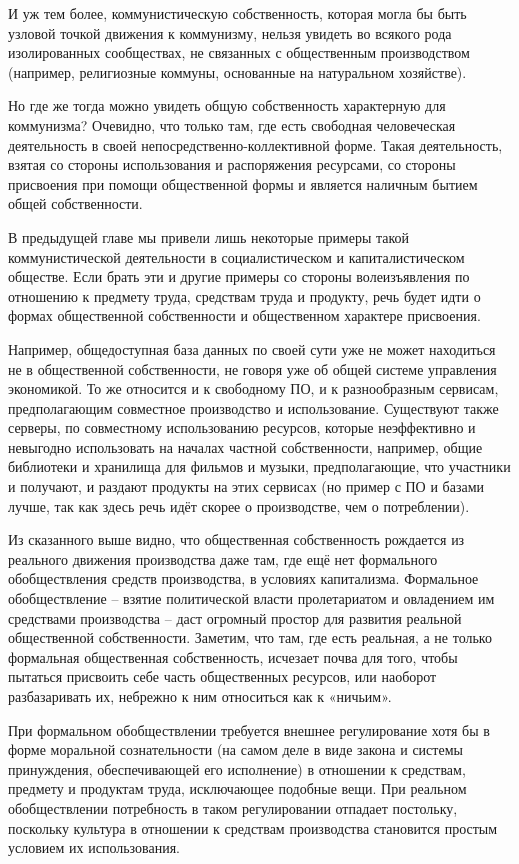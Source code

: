 \documentclass[12pt,a4paper,openany]{book}
\begin{document}
И уж тем более, коммунистическую собственность, которая могла бы быть узловой точкой движения к коммунизму, нельзя увидеть во всякого рода изолированных сообществах, не связанных с общественным производством (например, религиозные коммуны, основанные на натуральном хозяйстве).

Но где же тогда можно увидеть общую собственность характерную для коммунизма? Очевидно, что только там, где есть свободная человеческая деятельность в своей непосредственно-коллективной форме. Такая деятельность, взятая со стороны использования и распоряжения ресурсами, со стороны присвоения при помощи общественной формы и является наличным бытием общей собственности.

В предыдущей главе мы привели лишь некоторые примеры такой коммунистической деятельности в социалистическом и капиталистическом обществе. Если брать эти и другие примеры со стороны волеизъявления по отношению к предмету труда, средствам труда и продукту, речь будет идти о формах общественной собственности и общественном характере присвоения.

Например, общедоступная база данных по своей сути уже не может находиться не в общественной собственности, не говоря уже об общей системе управления экономикой. То же относится и к свободному ПО, и к разнообразным сервисам, предполагающим совместное производство и использование. Существуют также серверы, по совместному использованию ресурсов, которые неэффективно и невыгодно использовать на началах частной собственности, например, общие библиотеки и хранилища для фильмов и музыки, предполагающие, что участники и получают, и раздают продукты на этих сервисах (но пример с ПО и базами лучше, так как здесь речь идёт скорее о производстве, чем о потреблении).

Из сказанного выше видно, что общественная собственность рождается из реального движения производства даже там, где ещё нет формального обобществления средств производства, в условиях капитализма. Формальное обобществление – взятие политической власти пролетариатом и овладением им средствами производства – даст огромный простор для развития реальной общественной собственности. Заметим, что там, где есть реальная, а не только формальная общественная собственность, исчезает почва для того, чтобы пытаться присвоить себе часть общественных ресурсов, или наоборот разбазаривать их, небрежно к ним относиться как к «ничьим».

При формальном обобществлении требуется внешнее регулирование хотя бы в форме моральной сознательности (на самом деле в виде закона и системы принуждения, обеспечивающей его исполнение) в отношении к средствам, предмету и продуктам труда, исключающее подобные вещи. При реальном обобществлении потребность в таком регулировании отпадает постольку, поскольку культура в отношении к средствам производства становится простым условием их использования.
\ifSubfilesClassLoaded{\setcounter{page}{36}}{}
\end{document}
